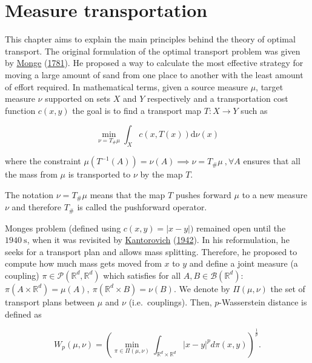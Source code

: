 \documentclass[
  11pt,
]{article}
\begin{document}
\hypertarget{measure-transportation}{%
\section{Measure transportation}\label{measure-transportation}}

This chapter aims to explain the main principles behind the theory of
optimal transport. The original formulation of the optimal transport
problem was given by \protect\hyperlink{ref-monge1781memoire}{Monge}
(\protect\hyperlink{ref-monge1781memoire}{1781}). He proposed a way to
calculate the most effective strategy for moving a large amount of sand
from one place to another with the least amount of effort required. In
mathematical terms, given a source measure \(\mu\), target measure
\(\nu\) supported on sets \(X\) and \(Y\) respectively and a
transportation cost function \(c(x,y)\) the goal is to find a transport
map \(T:X \rightarrow Y\) such as

\[\min _{\nu=T_{\#} \mu} \int_{X} c(x, T(x)) \mathrm{d} \nu(x)\]

where the constraint
\(\mu(T^{-1}(A)) = \nu(A) \implies \nu=T_{\#} \mu \ , \forall A\)
ensures that all the mass from \(\mu\) is transported to \(\nu\) by the
map \(T\).

The notation \(\nu=T_{\#} \mu\) means that the map \(T\) pushes forward
\(\mu\) to a new measure \(\nu\) and therefore \(T_{\#}\) is called the
pushforward operator.

Monges problem (defined using \(c(x, y)=|x-y|)\) remained open until the
\(1940 \mathrm{~s}\), when it was revisited by
\protect\hyperlink{ref-kantorovich1942translocation}{Kantorovich}
(\protect\hyperlink{ref-kantorovich1942translocation}{1942}). In his
reformulation, he seeks for a transport plan and allows mass splitting.
Therefore, he proposed to compute how much mass gets moved from \(x\) to
\(y\) and define a joint measure (a coupling)
\(\pi \in \mathcal{P}\left(\mathbb{R}^{d}, \mathbb{R}^{d}\right)\) which
satisfies for all \(A, B \in \mathcal{B}\left(\mathbb{R}^{d}\right)\):
\(\pi\left(A \times \mathbb{R}^{d}\right)=\mu(A), \ \pi\left(\mathbb{R}^{d} \times B\right)=\nu(B).\)
We denote by \(\Pi(\mu, \nu)\) the set of transport plans between
\(\mu\) and \(\nu\) (i.e.~couplings). Then, \(p\)-Wasserstein distance
is defined as

\begin{equation}
W_{p}(\mu, \nu)=\left(\min _{\pi \in \Pi(\mu, \nu)} \int_{\mathbb{R}^{d} \times \mathbb{R}^{d}}|x-y|^{p} d \pi(x, y)\right)^{\frac{1}{p}}.
\label{eq:wass_p}
\end{equation}
\end{document}
